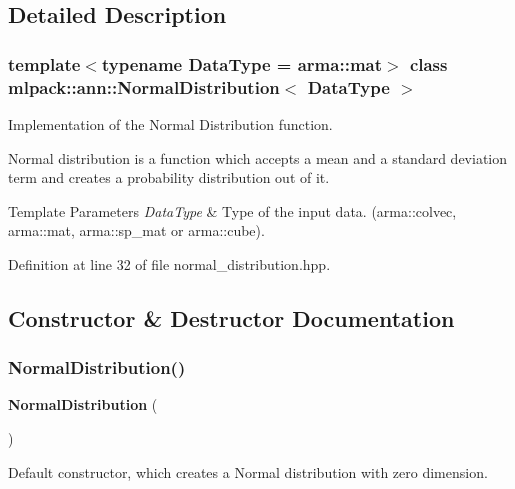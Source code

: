 \subsection{Detailed Description}
\subsubsection*{template$<$typename Data\+Type = arma\+::mat$>$\newline
class mlpack\+::ann\+::\+Normal\+Distribution$<$ Data\+Type $>$}

Implementation of the Normal Distribution function. 

Normal distribution is a function which accepts a mean and a standard deviation term and creates a probability distribution out of it.


\begin{DoxyTemplParams}{Template Parameters}
{\em Data\+Type} & Type of the input data. (arma\+::colvec, arma\+::mat, arma\+::sp\+\_\+mat or arma\+::cube). \\
\hline
\end{DoxyTemplParams}


Definition at line 32 of file normal\+\_\+distribution.\+hpp.



\subsection{Constructor \& Destructor Documentation}
\mbox{\label{classmlpack_1_1ann_1_1NormalDistribution_ab76c4ca0ad20a2d0e3c22c6a1b707571}} 
\subsubsection{Normal\+Distribution()\hspace{0.1cm}{\footnotesize\ttfamily [1/2]}}
{\footnotesize\ttfamily \textbf{ Normal\+Distribution} (\begin{DoxyParamCaption}{ }\end{DoxyParamCaption})}



Default constructor, which creates a Normal distribution with zero dimension. 

\mbox{\label{classmlpack_1_1ann_1_1NormalDistribution_a7dc8bd49c941fb88043958643d00d6d1}} 
